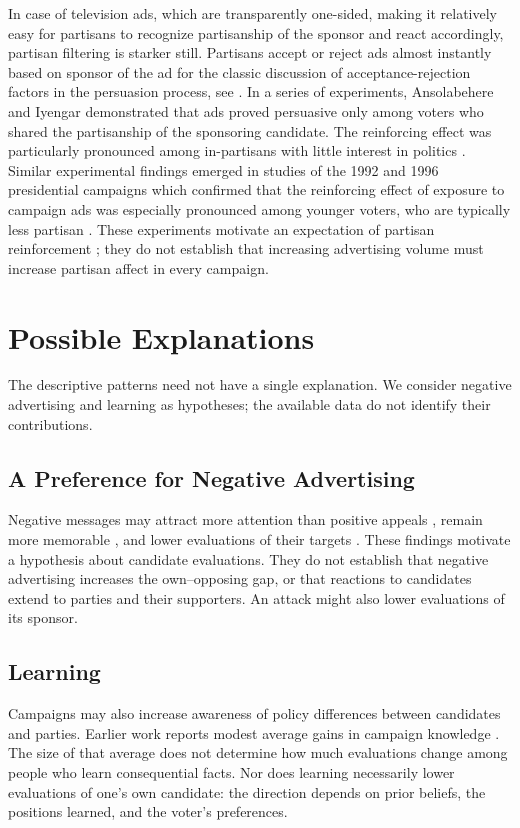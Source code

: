 \documentclass[11pt,letterpaper]{article}
\begin{document}
In case of television ads, which are transparently one-sided, making it relatively easy for partisans to recognize partisanship of the sponsor and react accordingly, partisan filtering is starker still. Partisans accept or reject ads almost instantly based on sponsor of the ad \citep{iyengar2008, mcguire1969} for the classic discussion of acceptance-rejection factors in the persuasion process, see \citealt{mcguire1985}. In a series of experiments, Ansolabehere and Iyengar demonstrated that ads proved persuasive only among voters who shared the partisanship of the sponsoring candidate.  The reinforcing effect was particularly pronounced among in-partisans with little interest in politics \citep[][pp. 76--80]{ansolabehere1995}. Similar experimental findings emerged in studies of the 1992 and 1996 presidential campaigns which confirmed that the reinforcing effect of exposure to campaign ads was especially pronounced among younger voters, who are typically less partisan \citep{iyengar2000a}.  These experiments motivate an expectation of partisan reinforcement \citep[for a review see][]{iyengar2000b}; they do not establish that increasing advertising volume must increase partisan affect in every campaign.

\section*{Possible Explanations}
The descriptive patterns need not have a single explanation. We consider negative advertising and learning as hypotheses; the available data do not identify their contributions.

\subsection*{A Preference for Negative Advertising}
Negative messages may attract more attention than positive appeals \citep{soroka2012, meffert2006}, remain more memorable \citep{lang1991, bradley2007, chang2001, newhagen1991}, and lower evaluations of their targets \citep{gaines2011}. These findings motivate a hypothesis about candidate evaluations. They do not establish that negative advertising increases the own--opposing gap, or that reactions to candidates extend to parties and their supporters. An attack might also lower evaluations of its sponsor.

\subsection*{Learning}
Campaigns may also increase awareness of policy differences between candidates and parties. Earlier work reports modest average gains in campaign knowledge \citep{geer2008, lau2007, lau2009, zhao1995, ridout2004, ansolabehere1995}. The size of that average does not determine how much evaluations change among people who learn consequential facts. Nor does learning necessarily lower evaluations of one's own candidate: the direction depends on prior beliefs, the positions learned, and the voter's preferences.
\end{document}
